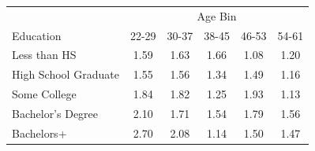 \begin{tabular}{lccccc}
\hline\hline
 & \multicolumn{5}{c}{Age Bin} \\
Education & 22-29 & 30-37 & 38-45 & 46-53 & 54-61 \\
\hline
Less than HS&1.59&1.63&1.66&1.08&1.20\\
High School Graduate&1.55&1.56&1.34&1.49&1.16\\
Some College&1.84&1.82&1.25&1.93&1.13\\
Bachelor's Degree&2.10&1.71&1.54&1.79&1.56\\
Bachelors+&2.70&2.08&1.14&1.50&1.47\\
\hline\hline
\end{tabular}

